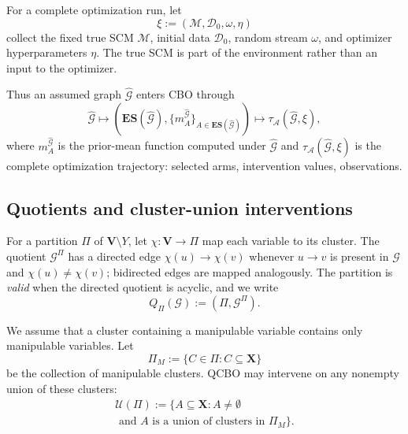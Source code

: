 \documentclass[twoside]{article}
\newcommand{\Gg}{\mathcal{G}}
\newcommand{\ES}{\mathbf{ES}}
\begin{document}
For a complete optimization run, let
\[
  \xi:=(\mathcal M,\mathcal D_0,\omega,\eta)
\]
collect the fixed true SCM $\mathcal M$, initial data $\mathcal D_0$, random stream $\omega$, and optimizer hyperparameters $\eta$. The true SCM is part of the environment rather than an input to the optimizer.

Thus an assumed graph ${\widehat{\mathcal G}}$ enters CBO through
\begin{equation}
 {\widehat{\mathcal G}}\longmapsto
 \left(\ES({\widehat{\mathcal G}}),\{m_A^{\widehat{\mathcal G}}\}_{A\in\ES({\widehat{\mathcal G}})}\right)
 \longmapsto \tau_{\mathcal A}({\widehat{\mathcal G}},\xi),
 \label{eq:trajectory-map}
\end{equation}
where $m_A^{\widehat{\mathcal G}}$ is the prior-mean function computed under ${\widehat{\mathcal G}}$ and $\tau_{\mathcal A}({\widehat{\mathcal G}},\xi)$ is the complete optimization trajectory: selected arms, intervention values, observations.


\subsection{Quotients and cluster-union interventions}

For a partition $\Pi$ of $\mathbf V \setminus Y $, let $\chi:\mathbf V\to\Pi$ map each variable to its cluster. The quotient $\Gg^\Pi$ has a directed edge $\chi(u)\to\chi(v)$ whenever $u\to v$ is present in $\Gg$ and $\chi(u)\ne\chi(v)$; bidirected edges are mapped analogously. The partition is \emph{valid} when the directed quotient is acyclic, and we write
\begin{equation}
  Q_\Pi(\Gg):=(\Pi,\Gg^\Pi).
  \label{eq:quotient}
\end{equation}

We assume that a cluster containing a manipulable variable contains only manipulable variables. Let
\[
  \Pi_M:=\{C\in\Pi:C\subseteq\mathbf X\}
\]
be the collection of manipulable clusters. QCBO may intervene on any
nonempty union of these clusters:
\begin{multline}
  \mathcal U(\Pi)
  :=
  \{
    A\subseteq\mathbf X:
    A\neq\emptyset \\
     \text{ and } A\text{ is a union of clusters in }\Pi_M \}. \\
  \label{eq:cluster-actions}
\end{multline}
\end{document}
